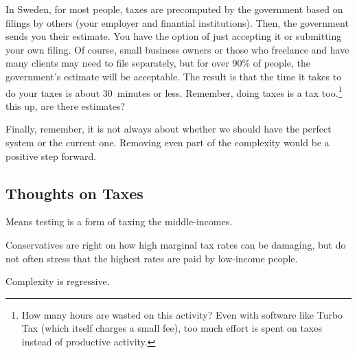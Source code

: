 In Sweden, for most people, taxes are precomputed by the government based on
filings by others (your employer and finantial institutions). Then, the
government sends you their estimate. You have the option of just accepting it
or submitting your own filing. Of course, small business owners or those who
freelance and have many clients may need to file separately, but for over 90\%
of people, the government's estimate will be acceptable. The result is that the
time it takes to do your taxes is about 30~minutes or less. Remember, doing
taxes is a tax too.\footnote{How many hours are wasted on this activity? Even
with software like Turbo Tax (which itself charges a small fee), too much
effort is spent on taxes instead of productive activity.}%
this up, are there estimates?

Finally, remember, it is not always about whether we should have the perfect
system or the current one. Removing even part of the complexity would be a
positive step forward.

\subsection{Thoughts on Taxes}

\thought Means testing is a form of taxing the middle-incomes.

\thought Conservatives are right on how high marginal tax rates can be
damaging, but do not often stress that the highest rates are paid by low-income
people.

\thought Complexity is regressive.

